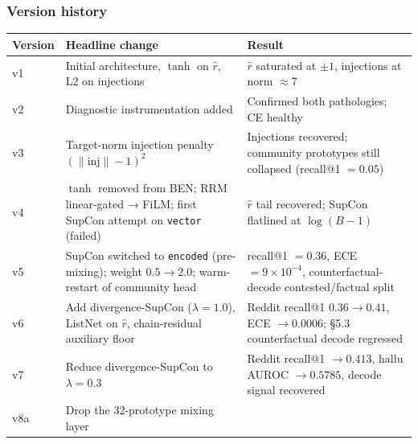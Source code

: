 \documentclass[
  11pt]{article}
\newcounter{none} %
\begin{document}
\subsubsection{Version history}\label{version-history}

{\def\LTcaptype{none} %
\begin{longtable}[]{@{}
  >{\raggedright\arraybackslash}p{}
  >{\raggedright\arraybackslash}p{}
  >{\raggedright\arraybackslash}p{}@{}}
\toprule\noalign{}
\begin{minipage}[b]{\linewidth}\raggedright
Version
\end{minipage} & \begin{minipage}[b]{\linewidth}\raggedright
Headline change
\end{minipage} & \begin{minipage}[b]{\linewidth}\raggedright
Result
\end{minipage} \\
\midrule\noalign{}
\endhead
\bottomrule\noalign{}
\endlastfoot
v1 & Initial architecture, \(\tanh\) on \(\hat{r}\), L2 on injections &
\(\hat{r}\) saturated at \(\pm 1\), injections at norm \(\approx 7\) \\
v2 & Diagnostic instrumentation added & Confirmed both pathologies; CE
healthy \\
v3 & Target-norm injection penalty \((\|\text{inj}\| - 1)^2\) &
Injections recovered; community prototypes still collapsed (recall@1
\(= 0.05\)) \\
v4 & \(\tanh\) removed from BEN; RRM linear-gated → FiLM; first SupCon
attempt on \texttt{vector} (failed) & \(\hat{r}\) tail recovered; SupCon
flatlined at \(\log(B-1)\) \\
v5 & SupCon switched to \texttt{encoded} (pre-mixing); weight
\(0.5 \to 2.0\); warm-restart of community head & recall@1 \(= 0.36\),
ECE \(= 9 \times 10^{-4}\), counterfactual-decode contested/factual
split \\
v6 & Add divergence-SupCon (\(\lambda = 1.0\)), ListNet on \(\hat{r}\),
chain-residual auxiliary floor & Reddit recall@1 \(0.36 \to 0.41\), ECE
\(\to 0.0006\); §5.3 counterfactual decode regressed \\
v7 & Reduce divergence-SupCon to \(\lambda = 0.3\) & Reddit recall@1
\(\to 0.413\), hallu AUROC \(\to 0.5785\), decode signal recovered \\
v8a & Drop the 32-prototype mixing layer

\end{longtable}}
\end{document}
